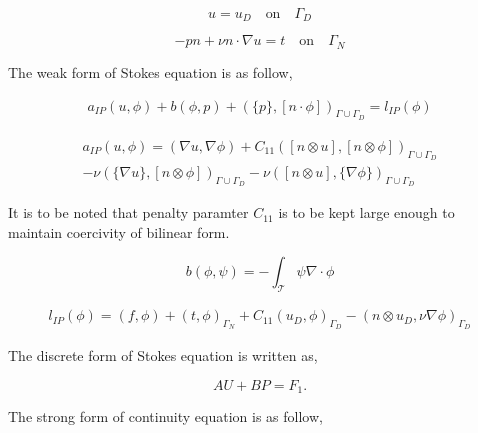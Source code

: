 \documentclass[a4paper,12pt]{book}
\begin{document}
\begin{equation} \label{dirichlet condition stokes_ch3}
u = u_D \quad \textrm{on} \quad \Gamma_D
\end{equation}

\begin{equation} \label{neumann condition stokes_ch3}
-pn + \nu n \cdot \nabla u = t \quad \textrm{on} \quad \Gamma_N
\end{equation}

The weak form of Stokes equation is as follow,

\begin{equation}\label{stokes_weak_ch3}
\begin{split}
a_{IP}(u,\phi) + b(\phi,p) + (\{p\},[n\cdot \phi])_{\Gamma \cup \Gamma_D} = l_{IP}(\phi) 
\end{split}
\end{equation}

\begin{equation}
\begin{split}
a_{IP}(u,\phi) = (\nabla u, \nabla \phi) + C_{11} ([n \otimes u],[n \otimes \phi])_{\Gamma \cup \Gamma_D} \\
- \nu (\{\nabla u\},[n \otimes \phi])_{\Gamma \cup \Gamma_D} - \nu ([n \otimes u],\{\nabla \phi\})_{\Gamma \cup \Gamma_D}
\end{split}
\end{equation}

It is to be noted that penalty paramter $C_{11}$ is to be kept large enough to maintain coercivity of bilinear form.

\begin{equation}
b(\phi,\psi) = -\int_{\mathcal{T}} \psi \nabla \cdot \phi
\end{equation}

\begin{equation}
\begin{split}
l_{IP}(\phi) = (f,\phi) + (t,\phi)_{\Gamma_N} + C_{11} (u_D,\phi)_{\Gamma_D} - (n \otimes u_D, \nu \nabla \phi)_{\Gamma_D}
\end{split}
\end{equation}

The discrete form of Stokes equation is written as,

\begin{equation} \label{stokes discrete_ch3}
AU + BP = F_1 \textrm{.}
\end{equation}

The strong form of continuity equation is as follow,
\end{document}
